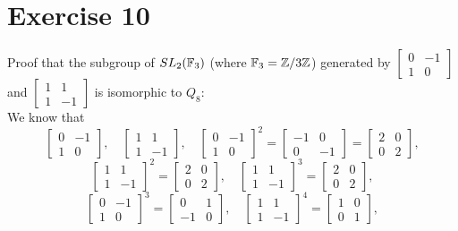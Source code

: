\documentclass[12pt]{article}
\begin{document}
    \section*{Exercise 10}
    Proof that the subgroup of $SL_2(\mathbb{F}_3)$
    (where $\mathbb{F}_3 = \mathbb{Z}/3\mathbb{Z}$)
    generated by $\begin{bmatrix} 0 & -1 \\ 1 & 0 \end{bmatrix}$
    and $\begin{bmatrix} 1 & 1 \\ 1 & -1 \end{bmatrix}$
    is isomorphic to $Q_8$: \\
    We know that 
    \[ \begin{bmatrix} 0 & -1 \\ 1 & 0 \end{bmatrix}, \quad
        \begin{bmatrix} 1 & 1 \\ 1 & -1 \end{bmatrix}, \quad
        \begin{bmatrix} 0 & -1 \\ 1 & 0 \end{bmatrix}^2
        = \begin{bmatrix} -1 & 0 \\ 0 & -1 \end{bmatrix}
        = \begin{bmatrix} 2 & 0 \\ 0 & 2 \end{bmatrix}, \] 
    \[ \begin{bmatrix} 1 & 1 \\ 1 & -1 \end{bmatrix}^2
    = \begin{bmatrix} 2 & 0 \\ 0 & 2 \end{bmatrix}, \quad
    \begin{bmatrix} 1 & 1 \\ 1 & -1 \end{bmatrix}^3
    = \begin{bmatrix} 2 & 0 \\ 0 & 2 \end{bmatrix}, \]
    \[ \begin{bmatrix} 0 & -1 \\ 1 & 0 \end{bmatrix}^3
    = \begin{bmatrix} 0 & 1 \\ -1 & 0 \end{bmatrix}, \quad
    \begin{bmatrix} 1 & 1 \\ 1 & -1 \end{bmatrix}^4
    = \begin{bmatrix} 1 & 0 \\ 0 & 1 \end{bmatrix}, \] 
\end{document}
